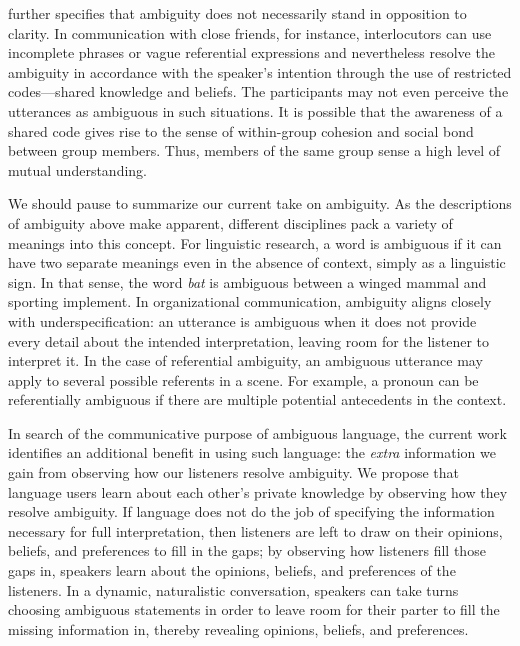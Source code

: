 \documentclass[10pt,a4paper]{article}
\begin{document}
 further specifies that ambiguity does not necessarily stand in opposition to clarity. In communication with close friends, for instance, interlocutors can use incomplete phrases or vague referential expressions and nevertheless resolve the ambiguity in accordance with the speaker's intention through the use of restricted codes---shared knowledge and beliefs. The participants may not even perceive the utterances as ambiguous in such situations. It is possible that the awareness of a shared code gives rise to the sense of within-group cohesion and social bond between group members. Thus, members of the same group sense a high level of mutual understanding.

We should pause to summarize our current take on ambiguity. As the descriptions of ambiguity above make apparent, different disciplines pack a variety of meanings into this concept. For linguistic research, a word is ambiguous if it can have two separate meanings even in the absence of context, simply as a linguistic sign. In that sense, the word \textit{bat} is ambiguous between a winged mammal and sporting implement. In organizational communication, ambiguity aligns closely with underspecification: an utterance is ambiguous when it does not provide every detail about the intended interpretation, leaving room for the listener to interpret it. In the case of referential ambiguity, an ambiguous utterance may apply to several possible referents in a scene. For example, a pronoun can be referentially ambiguous if there are multiple potential antecedents in the context.


In search of the communicative purpose of ambiguous language, the current work identifies an additional benefit in using such language: the \emph{extra} information we gain from observing how our listeners resolve ambiguity.
We propose that language users learn about each other's private knowledge by observing how they resolve ambiguity. If language does not do the job of specifying the information necessary for full interpretation, then listeners are left to draw on their opinions, beliefs, and preferences to fill in the gaps; by observing how listeners fill those gaps in, speakers learn about the opinions, beliefs, and preferences of the listeners.
In a dynamic, naturalistic conversation, speakers can take turns choosing ambiguous statements in order to leave room for their parter to fill the missing information in, thereby revealing opinions, beliefs, and preferences. 
\end{document}
